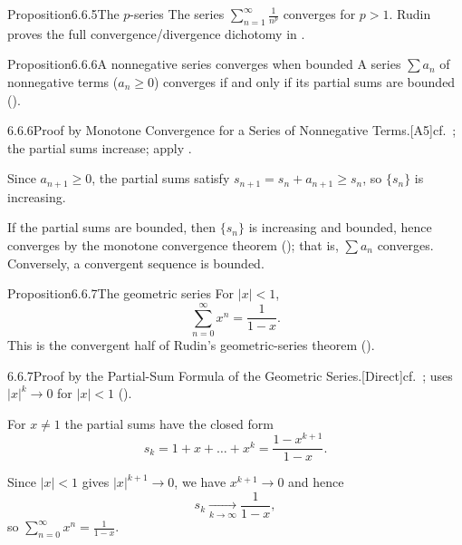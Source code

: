 \documentclass[main.tex]{subfiles}
\begin{document}
\begin{Obj}{Proposition}{6.6.5}{The $p$-series}
The series $\displaystyle\sum_{n=1}^\infty\frac{1}{n^p}$ converges for $p>1$.
Rudin proves the full convergence/divergence dichotomy in .
\end{Obj}

\begin{Obj}{Proposition}{6.6.6}{A nonnegative series converges when bounded}
A series $\sum a_n$ of nonnegative terms ($a_n\ge0$) converges if and only if its partial sums
are bounded ().
\end{Obj}
\begin{Prf}{6.6.6}{Proof by Monotone Convergence for a Series of Nonnegative Terms.}{[A5]\quad cf.\ ; the partial sums increase; apply .}
\item Since $a_{n+1}\ge0$, the partial sums satisfy $s_{n+1}=s_n+a_{n+1}\ge s_n$, so $\{s_n\}$ is increasing.
\item If the partial sums are bounded, then $\{s_n\}$ is increasing and bounded, hence converges by the monotone convergence theorem (); that is, $\sum a_n$ converges. Conversely, a convergent sequence is bounded.
\end{Prf}

\begin{Obj}{Proposition}{6.6.7}{The geometric series}
For $|x|<1$,
\[ \sum_{n=0}^\infty x^n = \frac{1}{1-x} . \]
This is the convergent half of Rudin's geometric-series theorem ().
\end{Obj}
\begin{Prf}{6.6.7}{Proof by the Partial-Sum Formula of the Geometric Series.}{[Direct]\quad cf.\ ; uses $|x|^{k}\to0$ for $|x|<1$ ().}
\item For $x\ne1$ the partial sums have the closed form
  \[ s_k = 1+x+\dots+x^k = \frac{1-x^{k+1}}{1-x} . \]
\item Since $|x|<1$ gives $|x|^{k+1}\to0$, we have $x^{k+1}\to0$ and hence
  \[ s_k \xrightarrow[k\to\infty]{} \frac{1}{1-x} , \]
  so $\displaystyle\sum_{n=0}^\infty x^n = \frac{1}{1-x}$.
\end{Prf}
\end{document}
